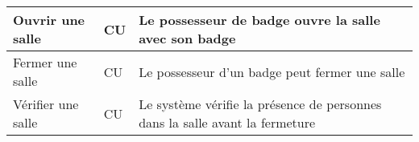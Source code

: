\begin{center}
\begin{longtable}[c]{|p{100pt}| p{50pt}| p{250pt}|}
	Ouvrir une salle 	&	CU	& Le possesseur de badge ouvre la salle avec son badge \\\hline
	
	Fermer une salle 	&	CU	& Le possesseur d'un badge peut fermer une salle \\\hline
	
	Vérifier une salle 	&	CU	& Le système vérifie la présence de personnes dans la salle avant la fermeture \\\hline
	
\end{longtable}
\end{center}

\subsection*{}

